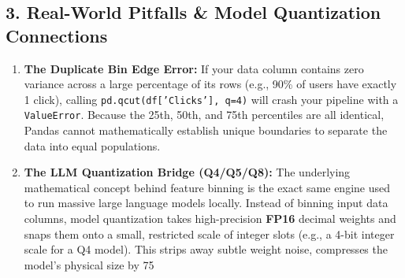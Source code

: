 \documentclass[12pt,a4paper]{article}
\begin{document}
\subsection*{3. Real-World Pitfalls \& Model Quantization Connections}
\begin{enumerate}
    \item \textbf{The Duplicate Bin Edge Error:} If your data column contains zero variance across a large percentage of its rows (e.g., 90\% of users have exactly 1 click), calling \texttt{pd.qcut(df['Clicks'], q=4)} will crash your pipeline with a \texttt{ValueError}. Because the 25th, 50th, and 75th percentiles are all identical, Pandas cannot mathematically establish unique boundaries to separate the data into equal populations.
    \item \textbf{The LLM Quantization Bridge (Q4/Q5/Q8):} The underlying mathematical concept behind feature binning is the exact same engine used to run massive large language models locally. Instead of binning input data columns, model quantization takes high-precision \textbf{FP16} decimal weights and snaps them onto a small, restricted scale of integer slots (e.g., a 4-bit integer scale for a Q4 model). This strips away subtle weight noise, compresses the model's physical size by 75%
\end{enumerate}
\end{document}
